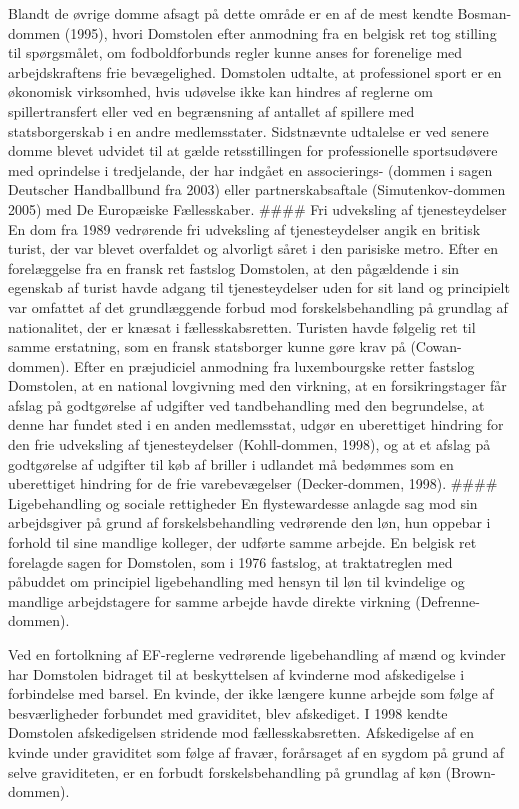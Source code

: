 \documentclass[]{book}
\begin{document}
Blandt de øvrige domme afsagt på dette område er en af de mest kendte Bosman-dommen (1995), hvori Domstolen efter anmodning fra en belgisk ret tog stilling til spørgsmålet, om fodboldforbunds regler kunne anses for forenelige med arbejdskraftens frie bevægelighed. Domstolen udtalte, at professionel sport er en økonomisk virksomhed, hvis udøvelse ikke kan hindres af reglerne om spillertransfert eller ved en begrænsning af antallet af spillere med statsborgerskab i en andre medlemsstater. Sidstnævnte udtalelse er ved senere domme blevet udvidet til at gælde retsstillingen for professionelle sportsudøvere med oprindelse i tredjelande, der har indgået en associerings- (dommen i sagen Deutscher Handballbund fra 2003) eller partnerskabsaftale (Simutenkov-dommen 2005) med De Europæiske Fællesskaber.
\#\#\#\# Fri udveksling af tjenesteydelser
En dom fra 1989 vedrørende fri udveksling af tjenesteydelser angik en britisk turist, der var blevet overfaldet og alvorligt såret i den parisiske metro. Efter en forelæggelse fra en fransk ret fastslog Domstolen, at den pågældende i sin egenskab af turist havde adgang til tjenesteydelser uden for sit land og principielt var omfattet af det grundlæggende forbud mod forskelsbehandling på grundlag af nationalitet, der er knæsat i fællesskabsretten. Turisten havde følgelig ret til samme erstatning, som en fransk statsborger kunne gøre krav på (Cowan-dommen).
Efter en præjudiciel anmodning fra luxembourgske retter fastslog Domstolen, at en national lovgivning med den virkning, at en forsikringstager får afslag på godtgørelse af udgifter ved tandbehandling med den begrundelse, at denne har fundet sted i en anden medlemsstat, udgør en uberettiget hindring for den frie udveksling af tjenesteydelser (Kohll-dommen, 1998), og at et afslag på godtgørelse af udgifter til køb af briller i udlandet må bedømmes som en uberettiget hindring for de frie varebevægelser (Decker-dommen, 1998).
\#\#\#\# Ligebehandling og sociale rettigheder
En flystewardesse anlagde sag mod sin arbejdsgiver på grund af forskelsbehandling vedrørende den løn, hun oppebar i forhold til sine mandlige kolleger, der udførte samme arbejde. En belgisk ret forelagde sagen for Domstolen, som i 1976 fastslog, at traktatreglen med påbuddet om principiel ligebehandling med hensyn til løn til kvindelige og mandlige arbejdstagere for samme arbejde havde direkte virkning (Defrenne-dommen).

Ved en fortolkning af EF-reglerne vedrørende ligebehandling af mænd og kvinder har Domstolen bidraget til at beskyttelsen af kvinderne mod afskedigelse i forbindelse med barsel. En kvinde, der ikke længere kunne arbejde som følge af besværligheder forbundet med graviditet, blev afskediget. I 1998 kendte Domstolen afskedigelsen stridende mod fællesskabsretten. Afskedigelse af en kvinde under graviditet som følge af fravær, forårsaget af en sygdom på grund af selve graviditeten, er en forbudt forskelsbehandling på grundlag af køn (Brown-dommen).
\end{document}

